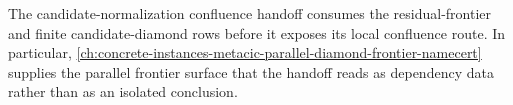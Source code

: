 The candidate-normalization confluence handoff consumes the residual-frontier and finite candidate-diamond rows before it exposes its local confluence route. In particular, \autoref{ch:concrete-instances-metacic-parallel-diamond-frontier-namecert} supplies the parallel frontier surface that the handoff reads as dependency data rather than as an isolated conclusion.
